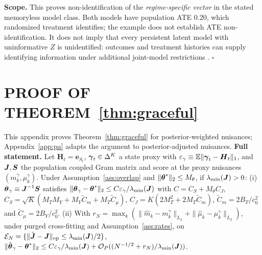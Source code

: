 \textbf{Scope.} This proves non-identification of the \emph{regime-specific vector} in the stated memoryless model class. Both models have population ATE $0.20$, which randomized treatment identifies; the example does not establish ATE non-identification. It does not imply that every persistent latent model with uninformative $Z$ is unidentified: outcomes and treatment histories can supply identifying information under additional joint-model restrictions \citep{allman2009identifiability}. $\square$

\section{PROOF OF THEOREM~\ref{thm:graceful}}
\label{app:proof_thm3}
This appendix proves Theorem~\ref{thm:graceful} for posterior-weighted nuisances; Appendix~\ref{app:pa} adapts the argument to posterior-adjusted nuisances. \textbf{Full statement.} Let $\boldsymbol{H}_t = \boldsymbol{e}_{S_t}$, $\boldsymbol{\gamma}_t \in \Delta^K$ a state proxy with $\varepsilon_\gamma \equiv \mathbb{E}\|\boldsymbol{\gamma}_t - \boldsymbol{H}_t\|_1$, and $\boldsymbol{J}, \boldsymbol{S}$ the population coupled Gram matrix and score at the proxy nuisances $(m_k^\gamma, \mu_k^\gamma)$. Under Assumption~\ref{ass:overlap} and $\|\boldsymbol{\theta}^*\|_2 \le M_\theta$, if $\lambda_{\min}(\boldsymbol{J}) > 0$:
(i) $\boldsymbol{\theta}_\gamma \equiv \boldsymbol{J}^{-1}\boldsymbol{S}$ satisfies $\|\boldsymbol{\theta}_\gamma - \boldsymbol{\theta}^*\|_2 \le C\varepsilon_\gamma/\lambda_{\min}(\boldsymbol{J})$ with $C = C_S + M_\theta C_J$, $C_S = \sqrt{K}(M_T M_Y + M_Y \tilde{C}_m + M_T \tilde{C}_\mu)$, $C_J = K(2M_T^2 + 2M_T \tilde{C}_m)$, $\tilde{C}_m = 2B_T/c_0^2$ and $\tilde{C}_\mu = 2B_Y/c_0^2$.
(ii) With $r_N = \max_k(\|\hat{m}_k - m_k^\gamma\|_{L_2} + \|\hat{\mu}_k - \mu_k^\gamma\|_{L_2})$, under purged cross-fitting and Assumption~\ref{ass:rates}, on $\mathcal{E}_N = \{\|\hat{\boldsymbol{J}} - \boldsymbol{J}\|_{\rm op} \le \lambda_{\min}(\boldsymbol{J})/2\}$, $\|\hat{\boldsymbol{\theta}}_\gamma - \boldsymbol{\theta}^*\|_2 \le C\varepsilon_\gamma/\lambda_{\min}(\boldsymbol{J}) + \mathcal{O}_P((N^{-1/2} + r_N)/\lambda_{\min}(\boldsymbol{J}))$.

